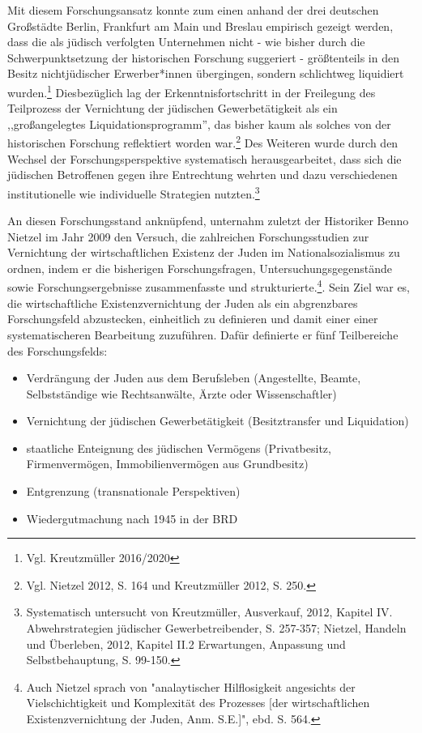 Mit diesem Forschungsansatz konnte zum einen anhand der drei deutschen Großstädte Berlin, Frankfurt am Main und Breslau empirisch  gezeigt werden, dass die als jüdisch verfolgten Unternehmen nicht - wie bisher durch die Schwerpunktsetzung der historischen Forschung suggeriert - größtenteils in den Besitz nichtjüdischer Erwerber*innen übergingen, sondern schlichtweg liquidiert wurden.\footnote{Vgl. Kreutzmüller 2016/2020} Diesbezüglich lag der Erkenntnisfortschritt in der Freilegung des Teilprozess der Vernichtung der jüdischen Gewerbetätigkeit als ein ,,großangelegtes Liquidationsprogramm'', das bisher kaum als solches von der historischen Forschung reflektiert worden war.\footnote{Vgl. Nietzel 2012, S. 164 und Kreutzmüller 2012, S. 250.} Des Weiteren wurde durch den Wechsel der Forschungsperspektive systematisch herausgearbeitet, dass sich die jüdischen Betroffenen gegen ihre Entrechtung wehrten und dazu verschiedenen institutionelle wie individuelle Strategien nutzten.\footnote{Systematisch untersucht von Kreutzmüller, Ausverkauf, 2012, Kapitel IV. Abwehrstrategien jüdischer Gewerbetreibender, S. 257-357; Nietzel, Handeln und Überleben, 2012, Kapitel II.2 Erwartungen, Anpassung und Selbstbehauptung, S. 99-150.}

An diesen Forschungsstand anknüpfend, unternahm zuletzt der Historiker Benno Nietzel im Jahr 2009 den Versuch, die zahlreichen Forschungsstudien zur Vernichtung der wirtschaftlichen Existenz der Juden im Nationalsozialismus zu ordnen, indem er die bisherigen Forschungsfragen, Untersuchungsgegenstände sowie Forschungsergebnisse zusammenfasste und strukturierte.\footnote{Auch Nietzel sprach von "analaytischer Hilflosigkeit angesichts der Vielschichtigkeit und Komplexität des Prozesses [der wirtschaftlichen Existenzvernichtung der Juden, Anm. S.E.]", ebd. S. 564.}. Sein Ziel war es, die wirtschaftliche Existenzvernichtung der Juden als ein abgrenzbares Forschungsfeld abzustecken, einheitlich zu definieren und damit einer einer systematischeren Bearbeitung zuzuführen. Dafür definierte er fünf Teilbereiche des Forschungsfelds:
\begin{itemize}
\item Verdrängung der Juden aus dem Berufsleben (Angestellte, Beamte, Selbstständige wie Rechtsanwälte, Ärzte oder Wissenschaftler)
\item Vernichtung der jüdischen Gewerbetätigkeit (Besitztransfer und Liquidation)
\item staatliche Enteignung des jüdischen Vermögens (Privatbesitz, Firmenvermögen, Immobilienvermögen aus Grundbesitz) 
\item Entgrenzung (transnationale Perspektiven)
\item Wiedergutmachung nach 1945 in der BRD
\end{itemize}


